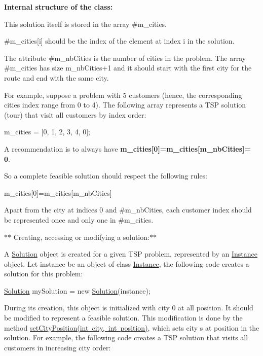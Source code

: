 {\bfseries Internal structure of the class\+:}

This solution itself is stored in the array \#m\+\_\+cities.

\#m\+\_\+cities\mbox{[}i\mbox{]} should be the index of the element at index i in the solution.

The attribute \#m\+\_\+nb\+Cities is the number of cities in the problem. The array \#m\+\_\+cities has size m\+\_\+nb\+Cities+1 and it should start with the first city for the route and end with the same city.

For example, suppose a problem with 5 customers (hence, the corresponding cities index range from 0 to 4). The following array represents a T\+SP solution (tour) that visit all customers by index order\+:


\begin{DoxyCode}
m\_cities = [0, 1, 2, 3, 4, 0];
\end{DoxyCode}


A recommendation is to always have {\bfseries m\+\_\+cities\mbox{[}0\mbox{]}=m\+\_\+cities\mbox{[}m\+\_\+nb\+Cities\mbox{]}= 0}.

So a complete feasible solution should respect the following rules\+:
\begin{DoxyItemize}
\item m\+\_\+cities\mbox{[}0\mbox{]}=m\+\_\+cities\mbox{[}m\+\_\+nb\+Cities\mbox{]}
\item Apart from the city at indices 0 and \#m\+\_\+nb\+Cities, each customer index should be represented once and only one in \#m\+\_\+cities.
\end{DoxyItemize}

$\ast$$\ast$ Creating, accessing or modifying a solution\+:$\ast$$\ast$

A \mbox{\hyperlink{classtsp_1_1_solution}{Solution}} object is created for a given T\+SP problem, represented by an \mbox{\hyperlink{classtsp_1_1_instance}{Instance}} object. Let instance be an object of class \mbox{\hyperlink{classtsp_1_1_instance}{Instance}}, the following code creates a solution for this problem\+:


\begin{DoxyCode}
\mbox{\hyperlink{classtsp_1_1_solution_a1d6b0b25fa67c11755bb5f753c610fa1}{Solution}} mySolution = \textcolor{keyword}{new} \mbox{\hyperlink{classtsp_1_1_solution_a1d6b0b25fa67c11755bb5f753c610fa1}{Solution}}(instance);
\end{DoxyCode}


During its creation, this object is initialized with city 0 at all position. It should be modified to represent a feasible solution. This modification is done by the method \mbox{\hyperlink{classtsp_1_1_solution_ac412146a40e865c6f0b2b8e44e4ba5e2}{set\+City\+Position(int city, int position)}}, which sets city s at position in the solution. For example, the following code creates a T\+SP solution that visits all customers in increasing city order\+:


